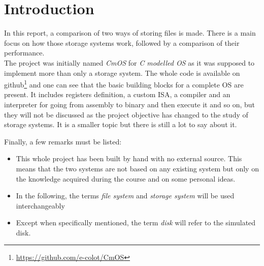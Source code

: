 \documentclass[10pt,a4paper]{ULBreport}
\begin{document}
 





\chapter{Introduction}

In this report, a comparison of two ways of storing files is made. There is a main focus on how those storage systems work, followed by a comparison of their performance. \\

The project was initially named \textit{CmOS} for \textit{C modelled OS} as it was supposed to implement more than only a storage system. The whole code is available on github\footnote{\href{https://github.com/e-colot/CmOS}{https://github.com/e-colot/CmOS}} and one can see that the basic building blocks for a complete OS are present. It includes registers definition, a custom ISA, a compiler and an interpreter for going from assembly to binary and then execute it and so on, but they will not be discussed as the project objective has changed to the study of storage systems. It is a smaller topic but there is still a lot to say about it. 

Finally, a few remarks must be listed:
\begin{itemize}
    \item This whole project has been built by hand with no external source. This means that the two systems are not based on any existing system but only on the knowledge acquired during the course and on some personal ideas.
    \item In the following, the terms \textit{file system} and \textit{storage system} will be used interchangeably
    \item Except when specifically mentioned, the term \textit{disk} will refer to the simulated disk.
\end{itemize}
\end{document}
